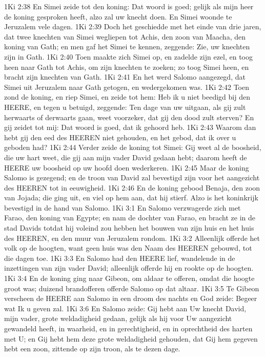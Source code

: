 1Ki 2:38  En Simei zeide tot den koning: Dat woord is goed; gelijk als mijn heer de koning gesproken heeft, alzo zal uw knecht doen. En Simei woonde te Jeruzalem vele dagen.
1Ki 2:39  Doch het geschiedde met het einde van drie jaren, dat twee knechten van Simei wegliepen tot Achis, den zoon van Maacha, den koning van Gath; en men gaf het Simei te kennen, zeggende: Zie, uw knechten zijn in Gath.
1Ki 2:40  Toen maakte zich Simei op, en zadelde zijn ezel, en toog heen naar Gath tot Achis, om zijn knechten te zoeken; zo toog Simei heen, en bracht zijn knechten van Gath.
1Ki 2:41  En het werd Salomo aangezegd, dat Simei uit Jeruzalem naar Gath getogen, en wedergekomen was.
1Ki 2:42  Toen zond de koning, en riep Simei, en zeide tot hem: Heb ik u niet beedigd bij den HEERE, en tegen u betuigd, zeggende: Ten dage van uw uitgaan, als gij zult herwaarts of derwaarts gaan, weet voorzeker, dat gij den dood zult sterven? En gij zeidet tot mij: Dat woord is goed, dat ik gehoord heb.
1Ki 2:43  Waarom dan hebt gij den eed des HEEREN niet gehouden, en het gebod, dat ik over u geboden had?
1Ki 2:44  Verder zeide de koning tot Simei: Gij weet al de boosheid, die uw hart weet, die gij aan mijn vader David gedaan hebt; daarom heeft de HEERE uw boosheid op uw hoofd doen wederkeren.
1Ki 2:45  Maar de koning Salomo is gezegend; en de troon van David zal bevestigd zijn voor het aangezicht des HEEREN tot in eeuwigheid.
1Ki 2:46  En de koning gebood Benaja, den zoon van Jojada; die ging uit, en viel op hem aan, dat hij stierf. Alzo is het koninkrijk bevestigd in de hand van Salomo.
1Ki 3:1  En Salomo verzwagerde zich met Farao, den koning van Egypte; en nam de dochter van Farao, en bracht ze in de stad Davids totdat hij voleind zou hebben het bouwen van zijn huis en het huis des HEEREN, en den muur van Jeruzalem rondom.
1Ki 3:2  Alleenlijk offerde het volk op de hoogten, want geen huis was den Naam des HEEREN gebouwd, tot die dagen toe.
1Ki 3:3  En Salomo had den HEERE lief, wandelende in de inzettingen van zijn vader David; alleenlijk offerde hij en rookte op de hoogten.
1Ki 3:4  En de koning ging naar Gibeon, om aldaar te offeren, omdat die hoogte groot was; duizend brandofferen offerde Salomo op dat altaar.
1Ki 3:5  Te Gibeon verscheen de HEERE aan Salomo in een droom des nachts en God zeide: Begeer wat Ik u geven zal.
1Ki 3:6  En Salomo zeide: Gij hebt aan Uw knecht David, mijn vader, grote weldadigheid gedaan, gelijk als hij voor Uw aangezicht gewandeld heeft, in waarheid, en in gerechtigheid, en in oprechtheid des harten met U; en Gij hebt hem deze grote weldadigheid gehouden, dat Gij hem gegeven hebt een zoon, zittende op zijn troon, als te dezen dage.
